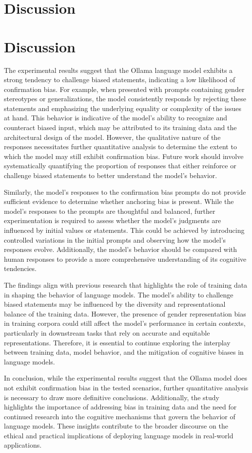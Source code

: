 \documentclass{article}
\begin{document}
\section{Discussion}
\section{Discussion}

The experimental results suggest that the Ollama language model exhibits a strong tendency to challenge biased statements, indicating a low likelihood of confirmation bias. For example, when presented with prompts containing gender stereotypes or generalizations, the model consistently responds by rejecting these statements and emphasizing the underlying equality or complexity of the issues at hand. This behavior is indicative of the model's ability to recognize and counteract biased input, which may be attributed to its training data and the architectural design of the model. However, the qualitative nature of the responses necessitates further quantitative analysis to determine the extent to which the model may still exhibit confirmation bias. Future work should involve systematically quantifying the proportion of responses that either reinforce or challenge biased statements to better understand the model's behavior.

Similarly, the model's responses to the confirmation bias prompts do not provide sufficient evidence to determine whether anchoring bias is present. While the model's responses to the prompts are thoughtful and balanced, further experimentation is required to assess whether the model's judgments are influenced by initial values or statements. This could be achieved by introducing controlled variations in the initial prompts and observing how the model's responses evolve. Additionally, the model's behavior should be compared with human responses to provide a more comprehensive understanding of its cognitive tendencies.

The findings align with previous research that highlights the role of training data in shaping the behavior of language models. The model's ability to challenge biased statements may be influenced by the diversity and representational balance of the training data. However, the presence of gender representation bias in training corpora could still affect the model's performance in certain contexts, particularly in downstream tasks that rely on accurate and equitable representations. Therefore, it is essential to continue exploring the interplay between training data, model behavior, and the mitigation of cognitive biases in language models.

In conclusion, while the experimental results suggest that the Ollama model does not exhibit confirmation bias in the tested scenarios, further quantitative analysis is necessary to draw more definitive conclusions. Additionally, the study highlights the importance of addressing bias in training data and the need for continued research into the cognitive mechanisms that govern the behavior of language models. These insights contribute to the broader discourse on the ethical and practical implications of deploying language models in real-world applications.
\end{document}

